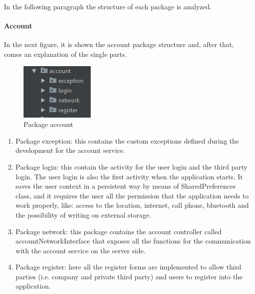 In the following paragraph the structure of each package is analyzed.

\paragraph{Account}
In the next figure, it is shown the account package structure and, after that, comes an explanation of the single parts.
  
\begin{figure}[H]
\includegraphics[width=\linewidth]{images/PackageAccount.png}
\caption{ Package account}
\label{fig:pkgsharedata}
\end{figure}

\begin{enumerate}
\item Package exception: this contains the custom exceptions defined during the development for the account service.
\item Package login: this contain the activity for the user login and the third party login. 
The user login is also the first activity when the application starts. 
It saves the user context in a persistent way by means of SharedPreferences class, and it requires the user all the permission that the
application needs to work properly, like: access to the location, internet, call phone, bluetooth and the possibility of writing on external
storage.
\item Package network: this package contains the account controller called accountNetworkInterface that exposes all the functions for the
communication with the account service on the server side.
\item Package register: here all the register forms are implemented to allow third parties (i.e. company and private third party) and
users to register into the application. 
\end{enumerate}

